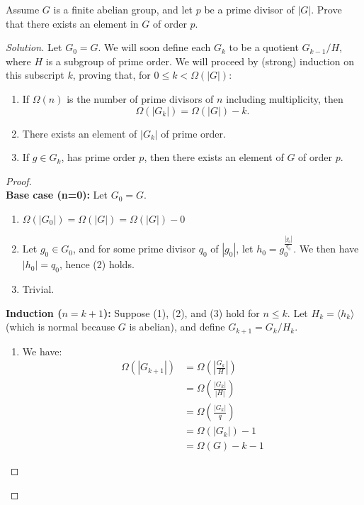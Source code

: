 \documentclass[12pt]{article}
\newenvironment{problem}[2][Problem]{\begin{trivlist}
\item[\hskip \labelsep {\bfseries #1}\hskip \labelsep {\bfseries #2.}]}{\end{trivlist}}
\newenvironment{solution}
  {\renewcommand\qedsymbol{$\blacksquare$}\begin{proof}[Solution]}
{\end{proof}}
\newenvironment{sproof}{
  \renewcommand\qedsymbol{$\square$}
  \begin{proof}
  }{
  \end{proof}
}
\theoremstyle{remark}
\begin{document}
\begin{problem}{8.17}
  Assume $G$ is a finite abelian group, and let $p$ be a prime divisor of $|G|$.
  Prove that there exists an element in $G$ of order $p$.
\end{problem}
\begin{solution}
  Let $G_0=G$. 
  We will soon define each $G_k$ to be a quotient $G_{k-1}/H$, where $H$ is a subgroup of prime order.
  We will proceed by (strong) induction on this subscript $k$, proving that, for $0\leq k<\Omega(|G|)$:
  \begin{enumerate}
    \item If $\Omega(n)$ is the number of prime divisors of $n$ including multiplicity, then 
      \begin{equation*}
        \Omega(|G_{k}|) = \Omega(|G|) - k.
      \end{equation*}
    \item There exists an element of $|G_k|$ of prime order.
    \item If $g\in G_{k}$, has prime order $p$, then there exists an element of $G$ of order $p$.
  \end{enumerate}
  \begin{sproof}~\\
    \textbf{Base case (n=0):} Let $G_0=G$.
    \begin{enumerate}
      \item $\Omega(|G_0|)=\Omega(|G|)=\Omega(|G|)-0$
      \item Let $g_0\in G_0$, and for some prime divisor $q_0$ of $|g_0|$, let $h_0=g_0^{\frac{|g_0|}{q_0}}$.
        We then have $|h_0| = q_0$, hence (2) holds.
      \item Trivial.
    \end{enumerate}
    \textbf{Induction ($n=k+1$):} Suppose (1), (2), and (3) hold for $n\leq k$.
    Let $H_k = \langle h_k\rangle$ (which is normal because $G$ is abelian), and define $G_{k+1} = G_k/H_k$.
    \begin{enumerate}
      \item We have:
        \begin{align*}
          \Omega(|G_{k+1}|) &= \Omega\left(\left|\frac{G_k}{H}\right|\right) \\
          &= \Omega\left( \frac{|G_k|}{|H|} \right) \\
          &= \Omega\left( \frac{|G_k|}{q} \right) \\
          &= \Omega(|G_k|) - 1 \\
          &= \Omega(G) - k - 1

\end{align*}
\end{enumerate}
\end{sproof}
\end{solution}
\end{document}
